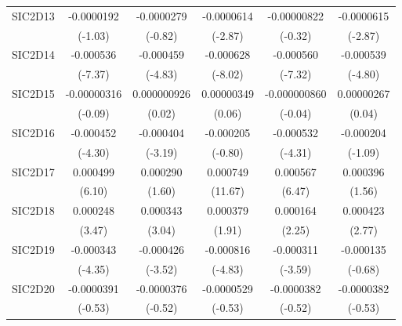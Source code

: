 \begin{table}[htbp]
\begin{tabular}{l*{5}{c}}
SIC2D13     &  -0.0000192         &  -0.0000279         &  -0.0000614\sym{**} & -0.00000822         &  -0.0000615\sym{**} \\
            &     (-1.03)         &     (-0.82)         &     (-2.87)         &     (-0.32)         &     (-2.87)         \\
SIC2D14     &   -0.000536\sym{***}&   -0.000459\sym{***}&   -0.000628\sym{***}&   -0.000560\sym{***}&   -0.000539\sym{***}\\
            &     (-7.37)         &     (-4.83)         &     (-8.02)         &     (-7.32)         &     (-4.80)         \\
SIC2D15     & -0.00000316         & 0.000000926         &  0.00000349         &-0.000000860         &  0.00000267         \\
            &     (-0.09)         &      (0.02)         &      (0.06)         &     (-0.04)         &      (0.04)         \\
SIC2D16     &   -0.000452\sym{***}&   -0.000404\sym{**} &   -0.000205         &   -0.000532\sym{***}&   -0.000204         \\
            &     (-4.30)         &     (-3.19)         &     (-0.80)         &     (-4.31)         &     (-1.09)         \\
SIC2D17     &    0.000499\sym{***}&    0.000290         &    0.000749\sym{***}&    0.000567\sym{***}&    0.000396         \\
            &      (6.10)         &      (1.60)         &     (11.67)         &      (6.47)         &      (1.56)         \\
SIC2D18     &    0.000248\sym{***}&    0.000343\sym{**} &    0.000379         &    0.000164\sym{*}  &    0.000423\sym{**} \\
            &      (3.47)         &      (3.04)         &      (1.91)         &      (2.25)         &      (2.77)         \\
SIC2D19     &   -0.000343\sym{***}&   -0.000426\sym{***}&   -0.000816\sym{***}&   -0.000311\sym{***}&   -0.000135         \\
            &     (-4.35)         &     (-3.52)         &     (-4.83)         &     (-3.59)         &     (-0.68)         \\
SIC2D20     &  -0.0000391         &  -0.0000376         &  -0.0000529         &  -0.0000382         &  -0.0000382         \\
            &     (-0.53)         &     (-0.52)         &     (-0.53)         &     (-0.52)         &     (-0.53)         \\

\end{tabular}
\end{table}
